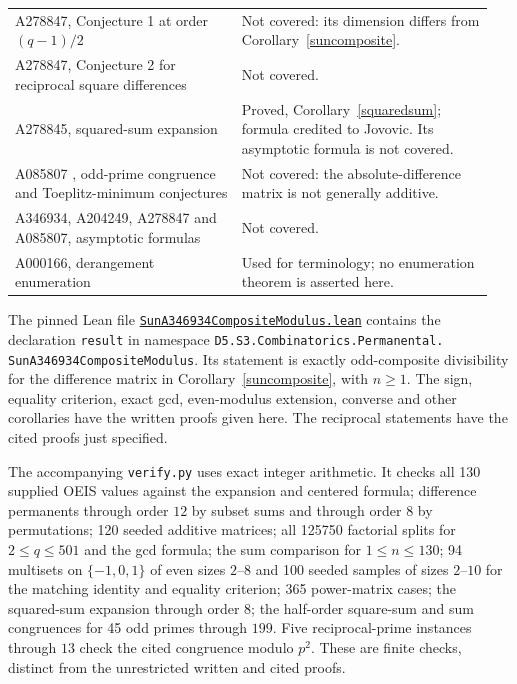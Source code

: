 \documentclass[11pt]{article}
\begin{document}
\begin{longtable}{@{}p{0.45\linewidth}p{0.50\linewidth}@{}}
A278847, Conjecture 1 at order $(q-1)/2$ & Not covered: its dimension differs from Corollary~\ref{suncomposite}. \\
A278847, Conjecture 2 for reciprocal square differences & Not covered. \\
A278845, squared-sum expansion & Proved, Corollary~\ref{squaredsum}; formula credited to Jovovic. Its asymptotic formula is not covered. \\
A085807 \cite{absolute}, odd-prime congruence and Toeplitz-minimum conjectures & Not covered: the absolute-difference matrix is not generally additive. \\
A346934, A204249, A278847 and A085807, asymptotic formulas & Not covered. \\
A000166, derangement enumeration & Used for terminology; no enumeration theorem is asserted here. \\
\bottomrule
\end{longtable}
\normalsize

The pinned Lean file
\href{https://github.com/the-omega-institute/trureturing/blob/eac52692d71b89f89bd7c0d8c734ddc9c5d9e61d/D5/S3/Combinatorics/Permanental/SunA346934CompositeModulus.lean}{\texttt{SunA346934CompositeModulus.lean}}
contains the declaration \texttt{result} in namespace
\texttt{D5.S3.Combinatorics.Permanental.}\allowbreak
\texttt{SunA346934CompositeModulus}.
Its statement is exactly odd-composite divisibility for the difference
matrix in Corollary~\ref{suncomposite}, with $n\ge1$.
The sign, equality criterion, exact gcd, even-modulus extension,
converse and other corollaries have the written proofs given here.
The reciprocal statements have the cited proofs just specified.

The accompanying \texttt{verify.py} uses exact integer arithmetic.
It checks all 130 supplied OEIS values against the expansion and
centered formula; difference permanents through order $12$ by subset
sums and through order $8$ by permutations; 120 seeded additive matrices;
all 125750 factorial splits for $2\le q\le501$ and the gcd formula;
the sum comparison for $1\le n\le130$; 94 multisets on
$\{-1,0,1\}$ of even sizes $2$--$8$ and 100 seeded samples of
sizes $2$--$10$ for the matching identity and equality criterion;
365 power-matrix cases; the squared-sum expansion through order $8$;
the half-order square-sum and sum congruences for 45 odd primes
through $199$. Five reciprocal-prime instances through $13$ check
the cited congruence modulo $p^2$. These are finite checks, distinct
from the unrestricted written and cited proofs.
\end{document}

